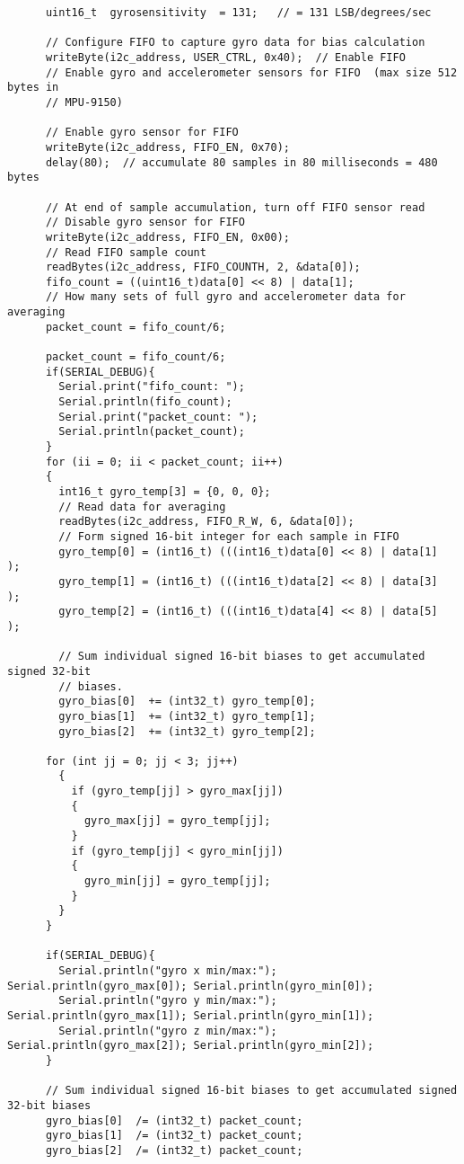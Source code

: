 \begin{lstlisting}
	  uint16_t  gyrosensitivity  = 131;   // = 131 LSB/degrees/sec

	  // Configure FIFO to capture gyro data for bias calculation
	  writeByte(i2c_address, USER_CTRL, 0x40);  // Enable FIFO
	  // Enable gyro and accelerometer sensors for FIFO  (max size 512 bytes in
	  // MPU-9150)

	  // Enable gyro sensor for FIFO
	  writeByte(i2c_address, FIFO_EN, 0x70);
	  delay(80);  // accumulate 80 samples in 80 milliseconds = 480 bytes

	  // At end of sample accumulation, turn off FIFO sensor read
	  // Disable gyro sensor for FIFO
	  writeByte(i2c_address, FIFO_EN, 0x00);
	  // Read FIFO sample count
	  readBytes(i2c_address, FIFO_COUNTH, 2, &data[0]);
	  fifo_count = ((uint16_t)data[0] << 8) | data[1];
	  // How many sets of full gyro and accelerometer data for averaging
	  packet_count = fifo_count/6;

	  packet_count = fifo_count/6;
	  if(SERIAL_DEBUG){
	    Serial.print("fifo_count: ");
	    Serial.println(fifo_count);
	    Serial.print("packet_count: ");
	    Serial.println(packet_count);
	  }
	  for (ii = 0; ii < packet_count; ii++)
	  {
	    int16_t gyro_temp[3] = {0, 0, 0};
	    // Read data for averaging
	    readBytes(i2c_address, FIFO_R_W, 6, &data[0]);
	    // Form signed 16-bit integer for each sample in FIFO
	    gyro_temp[0] = (int16_t) (((int16_t)data[0] << 8) | data[1]  );
	    gyro_temp[1] = (int16_t) (((int16_t)data[2] << 8) | data[3]  );
	    gyro_temp[2] = (int16_t) (((int16_t)data[4] << 8) | data[5]  );

	    // Sum individual signed 16-bit biases to get accumulated signed 32-bit
	    // biases.
	    gyro_bias[0]  += (int32_t) gyro_temp[0];
	    gyro_bias[1]  += (int32_t) gyro_temp[1];
	    gyro_bias[2]  += (int32_t) gyro_temp[2];

	  for (int jj = 0; jj < 3; jj++)
	    {
	      if (gyro_temp[jj] > gyro_max[jj])
	      {
	        gyro_max[jj] = gyro_temp[jj];
	      }
	      if (gyro_temp[jj] < gyro_min[jj])
	      {
	        gyro_min[jj] = gyro_temp[jj];
	      }
	    }
	  }

	  if(SERIAL_DEBUG){
	    Serial.println("gyro x min/max:"); Serial.println(gyro_max[0]); Serial.println(gyro_min[0]);
	    Serial.println("gyro y min/max:"); Serial.println(gyro_max[1]); Serial.println(gyro_min[1]);
	    Serial.println("gyro z min/max:"); Serial.println(gyro_max[2]); Serial.println(gyro_min[2]);
	  }

	  // Sum individual signed 16-bit biases to get accumulated signed 32-bit biases
	  gyro_bias[0]  /= (int32_t) packet_count;
	  gyro_bias[1]  /= (int32_t) packet_count;
	  gyro_bias[2]  /= (int32_t) packet_count;


\end{lstlisting}
